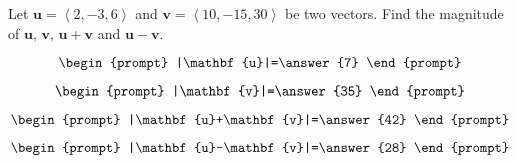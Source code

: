 \documentclass{ximera}
\author{Gregory Hartman \and Matthew Carr}
\begin{document}
\begin{exercise}




Let $\mathbf{u}=\left\langle2,-3,6\right\rangle$ and $\mathbf{v}=\left\langle10,-15,30\right\rangle$ be two vectors. Find the magnitude of $\mathbf{u}$, $\mathbf{v}$, $\mathbf{u}+\mathbf{v}$ and $\mathbf{u}-\mathbf{v}$.

\[
\begin{prompt}
|\mathbf{u}|=\answer{7}
\end{prompt}
\]

\[
\begin{prompt}
|\mathbf{v}|=\answer{35}
\end{prompt}
\]

\[
\begin{prompt}
|\mathbf{u}+\mathbf{v}|=\answer{42}
\end{prompt}
\]

\[
\begin{prompt}
|\mathbf{u}-\mathbf{v}|=\answer{28}
\end{prompt}
\]


\end{exercise}
\end{document}
